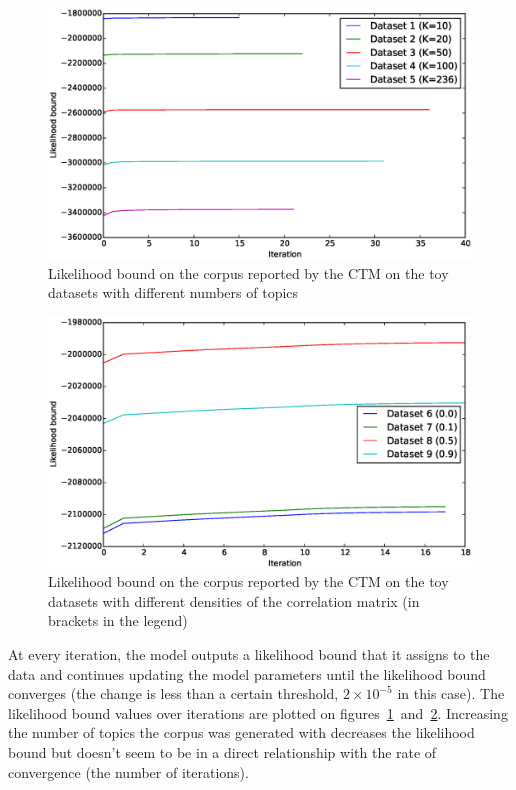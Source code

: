 \documentclass[12pt,a4paper,twoside,openright]{report}
\begin{document}
\begin{figure}[!htb]
\includegraphics[width=\textwidth]{sim-likelihood-bounds-1-5.eps}
\caption{Likelihood bound on the corpus reported by the CTM on the toy datasets with different numbers of topics}
\label{fig:sim-likelihood-bounds-1-5}
\end{figure}

\begin{figure}[!htb]
\includegraphics[width=\textwidth]{sim-likelihood-bounds-6-9.eps}
\caption{Likelihood bound on the corpus reported by the CTM on the toy datasets with different densities of the correlation matrix (in brackets in the legend)}
\label{fig:sim-likelihood-bounds-6-9}
\end{figure}

At every iteration, the model outputs a likelihood bound that it assigns to the data and continues updating the model parameters until the likelihood bound converges (the change is less than a certain threshold, $2\times10^{-5}$ in this case). The likelihood bound values over iterations are plotted on figures~\ref{fig:sim-likelihood-bounds-1-5}~and~\ref{fig:sim-likelihood-bounds-6-9}. Increasing the number of topics the corpus was generated with decreases the likelihood bound but doesn't seem to be in a direct relationship with the rate of convergence (the number of iterations).
\end{document}
